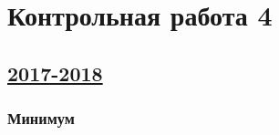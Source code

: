 \clearpage
\thispagestyle{empty}
\section{Контрольная работа 4}



\subsection[2017-2018]{\hyperref[sec:sol_kr_04_2017_2018]{2017-2018}}
\label{sec:kr_04_2017_2018}



\subsubsection*{Минимум}

